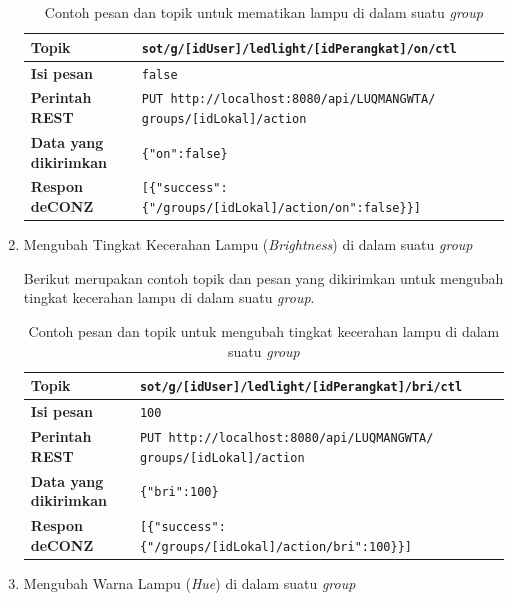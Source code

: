 \begin{enumerate}
	\begin{table}
		\centering
		\caption{Contoh pesan dan topik untuk mematikan lampu di dalam suatu \textit{group}}
		\label{tab:matiinLampuInGroup}
		\begin{tabular}{| l | p{11cm} |}
			\hline
			\textbf{Topik} & \texttt{sot/g/[idUser]/ledlight/[idPerangkat]/on/ctl} \\
			\hline
			\textbf{Isi pesan} & \texttt{false} \\
			\hline
			\textbf{Perintah REST} & \texttt{PUT http://localhost:8080/api/LUQMANGWTA/ groups/[idLokal]/action} \\
			\hline
			\textbf{Data yang dikirimkan} & \texttt{\{"on":false\}} \\
			\hline
			\textbf{Respon deCONZ} & \texttt{[\{"success":\{"/groups/[idLokal]/action/on":false\}\}]} \\
			\hline
		\end{tabular}
	\end{table}
	
	\item Mengubah Tingkat Kecerahan Lampu (\textit{Brightness}) di dalam suatu \textit{group}
	
	Berikut merupakan contoh topik dan pesan yang dikirimkan untuk mengubah tingkat kecerahan lampu di dalam suatu \textit{group}.
	
	\begin{table}
		\centering
		\caption{Contoh pesan dan topik untuk mengubah tingkat kecerahan lampu di dalam suatu \textit{group}}
		\label{tab:brightnessLampuInGroup}
		\begin{tabular}{| l | p{11cm} |}
			\hline
			\textbf{Topik} & \texttt{sot/g/[idUser]/ledlight/[idPerangkat]/bri/ctl} \\
			\hline
			\textbf{Isi pesan} & \texttt{100} \\
			\hline
			\textbf{Perintah REST} & \texttt{PUT http://localhost:8080/api/LUQMANGWTA/ groups/[idLokal]/action} \\
			\hline
			\textbf{Data yang dikirimkan} & \texttt{\{"bri":100\}} \\
			\hline
			\textbf{Respon deCONZ} & \texttt{[\{"success":\{"/groups/[idLokal]/action/bri":100\}\}]} \\
			\hline
		\end{tabular}
	\end{table}
	
	\item Mengubah Warna Lampu (\textit{Hue}) di dalam suatu \textit{group}
	

\end{enumerate}
